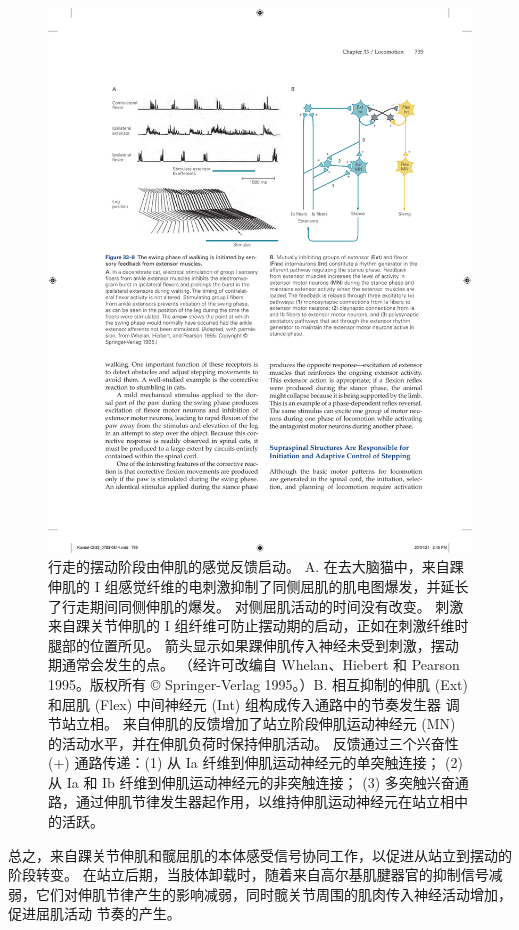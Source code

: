 \begin{figure}[htbp]
	\centering
	\includegraphics[width=0.9\linewidth]{chap33/fig_33_9}
	\caption{行走的摆动阶段由伸肌的感觉反馈启动。 A. 在去大脑猫中，来自踝伸肌的 I 组感觉纤维的电刺激抑制了同侧屈肌的肌电图爆发，并延长了行走期间同侧伸肌的爆发。 对侧屈肌活动的时间没有改变。 刺激来自踝关节伸肌的 I 组纤维可防止摆动期的启动，正如在刺激纤维时腿部的位置所见。 箭头显示如果踝伸肌传入神经未受到刺激，摆动期通常会发生的点。 （经许可改编自 Whelan、Hiebert 和 Pearson 1995。版权所有 © Springer-Verlag 1995。）B. 相互抑制的伸肌 (Ext) 和屈肌 (Flex) 中间神经元 (Int) 组构成传入通路中的节奏发生器 调节站立相。 来自伸肌的反馈增加了站立阶段伸肌运动神经元 (MN) 的活动水平，并在伸肌负荷时保持伸肌活动。 反馈通过三个兴奋性 (+) 通路传递：(1) 从 Ia 纤维到伸肌运动神经元的单突触连接； (2) 从 Ia 和 Ib 纤维到伸肌运动神经元的非突触连接； (3) 多突触兴奋通路，通过伸肌节律发生器起作用，以维持伸肌运动神经元在站立相中的活跃。}
	\label{fig:33_9}
\end{figure}


总之，来自踝关节伸肌和髋屈肌的本体感受信号协同工作，以促进从站立到摆动的阶段转变。
在站立后期，当肢体卸载时，随着来自高尔基肌腱器官的抑制信号减弱，它们对伸肌节律产生的影响减弱，同时髋关节周围的肌肉传入神经活动增加，促进屈肌活动 节奏的产生。


